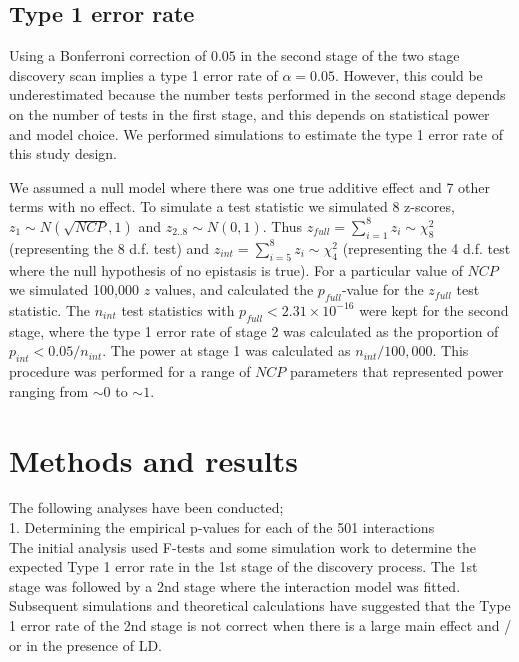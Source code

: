 \documentclass[paper=a4, fontsize=11pt]{scrartcl}         %
\numberwithin{equation}{section}                  %
\numberwithin{figure}{section}                    %
\numberwithin{table}{section}                   %
\begin{document}
\subsection*{Type 1 error rate}

Using a Bonferroni correction of $0.05$ in the second stage of the two stage discovery scan implies a type 1 error rate of $\alpha = 0.05$. However, this could be underestimated because the number tests performed in the second stage depends on the number of tests in the first stage, and this depends on statistical power and model choice. We performed simulations to estimate the type 1 error rate of this study design.

We assumed a null model where there was one true additive effect and 7 other terms with no effect. To simulate a test statistic we simulated 8 z-scores, $z_1 \sim N(\sqrt{NCP}, 1)$ and $z_{2..8} \sim N(0,1)$. Thus $z_{full} = \sum^8_{i=1}{z_i} \sim \chi^{2}_{8}$ (representing the 8 d.f. test) and $z_{int} = \sum^8_{i=5}{z_i} \sim \chi^{2}_{4}$ (representing the 4 d.f. test where the null hypothesis of no epistasis is true). For a particular value of $NCP$ we simulated 100,000 $z$ values, and calculated the $p_{full}$-value for the $z_{full}$ test statistic. The $n_{int}$ test statistics with $p_{full} < 2.31 \times 10^{-16}$ were kept for the second stage, where the type 1 error rate of stage 2 was calculated as the proportion of $p_{int} < 0.05 / n_{int}$. The power at stage 1 was calculated as $n_{int} / 100,000$. This procedure was performed for a range of $NCP$ parameters that represented power ranging from $\sim 0$ to $\sim 1$.

\newpage

\section*{Methods and results}

The following analyses have been conducted; \\

1. Determining the empirical p-values for each of the 501 interactions \\

The initial analysis used F-tests and some simulation work to determine the expected Type 1 error rate in the 1st stage of the discovery process. The 1st stage was followed by a 2nd stage where the interaction model was fitted. Subsequent simulations and theoretical calculations have suggested that the Type 1 error rate of the 2nd stage is not correct when there is a large main effect and / or in the presence of LD.  \\
\end{document}
